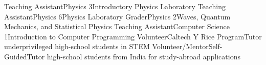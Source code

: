 

\begin{teachings}
				{Teaching Assistant}{Physics 3}{Introductory Physics Laboratory}
				{Teaching Assistant}{Physics 6}{Physics Laboratory}
				{Grader}{Physics 2}{Waves, Quantum Mechanics, and Statistical Physics}
				{Teaching Assistant}{Computer Science 1}{Introduction to Computer Programming}
				{Volunteer}{Caltech Y Rice Program}{Tutor underprivileged high-school students in STEM}
				{Volunteer/Mentor}{Self-Guided}{Tutor high-school students from India for study-abroad applications}
\end{teachings}
